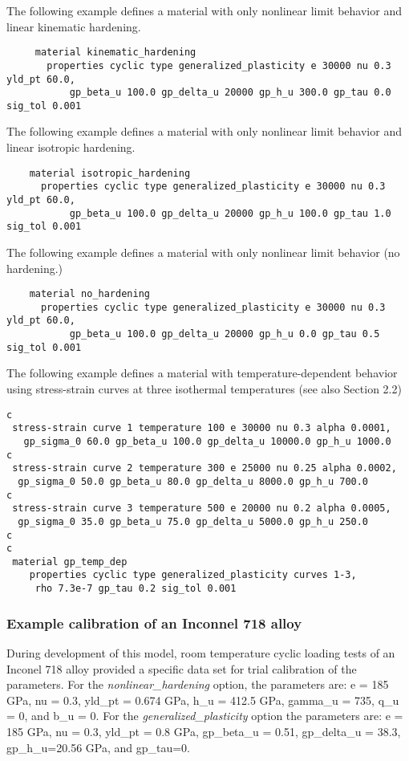 \documentclass[11pt]{report}
\numberwithin{equation}{section}
\begin{document}
\noindent The following example defines a material with only nonlinear limit behavior and linear kinematic hardening.
\small
 \begin{verbatim}
     material kinematic_hardening
       properties cyclic type generalized_plasticity e 30000 nu 0.3 yld_pt 60.0,
           gp_beta_u 100.0 gp_delta_u 20000 gp_h_u 300.0 gp_tau 0.0 sig_tol 0.001
\end{verbatim}
 \normalsize
 
\noindent The following example defines a material with only nonlinear limit behavior and linear isotropic  hardening.
\small
 \begin{verbatim}
    material isotropic_hardening
      properties cyclic type generalized_plasticity e 30000 nu 0.3 yld_pt 60.0,
           gp_beta_u 100.0 gp_delta_u 20000 gp_h_u 100.0 gp_tau 1.0 sig_tol 0.001
\end{verbatim}
 \normalsize
 
\noindent The following example defines a material with only nonlinear limit behavior (no hardening.)
\small
 \begin{verbatim}
    material no_hardening
      properties cyclic type generalized_plasticity e 30000 nu 0.3 yld_pt 60.0,
           gp_beta_u 100.0 gp_delta_u 20000 gp_h_u 0.0 gp_tau 0.5 sig_tol 0.001
\end{verbatim}
\normalsize

\noindent The following example defines a material with temperature-dependent behavior 
using stress-strain curves at three isothermal temperatures (see also Section 2.2)
\small
 \begin{verbatim}
c
 stress-strain curve 1 temperature 100 e 30000 nu 0.3 alpha 0.0001,
   gp_sigma_0 60.0 gp_beta_u 100.0 gp_delta_u 10000.0 gp_h_u 1000.0
c
 stress-strain curve 2 temperature 300 e 25000 nu 0.25 alpha 0.0002,
  gp_sigma_0 50.0 gp_beta_u 80.0 gp_delta_u 8000.0 gp_h_u 700.0
c
 stress-strain curve 3 temperature 500 e 20000 nu 0.2 alpha 0.0005,
  gp_sigma_0 35.0 gp_beta_u 75.0 gp_delta_u 5000.0 gp_h_u 250.0
c
c
 material gp_temp_dep
    properties cyclic type generalized_plasticity curves 1-3,
     rho 7.3e-7 gp_tau 0.2 sig_tol 0.001
 \end{verbatim}
\normalsize


\subsubsection {Example calibration of an Inconnel 718 alloy}
During development of this model, room temperature cyclic loading tests of
an Inconel 718 alloy provided a specific data set for trial calibration of the
parameters. For the \textit{nonlinear\_hardening} option, the parameters 
are: e = 185 GPa, nu = 0.3, yld\_pt = 0.674 GPa, 
h\_u = 412.5 GPa, gamma\_u = 735,
q\_u = 0, and b\_u = 0. For the \textit{generalized\_plasticity} option the
parameters are: e = 185 GPa, nu = 0.3, yld\_pt = 0.8 GPa, gp\_beta\_u = 0.51,
gp\_delta\_u = 38.3, gp\_h\_u=20.56 GPa, and gp\_tau=0. 
\end{document}
